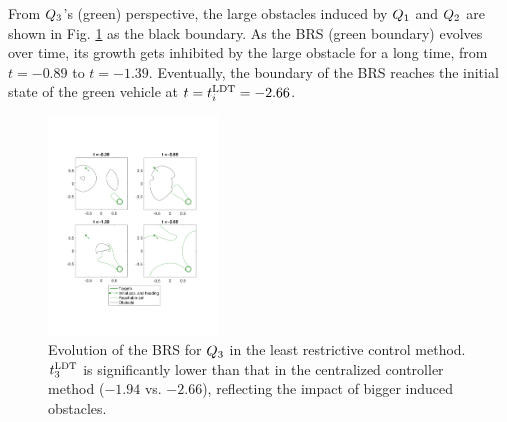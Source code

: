 From $Q_3$'s (green) perspective, the large obstacles induced by $Q_1$ and $Q_2$ are shown in Fig. \ref{fig:lrc_rs3} as the black boundary. As the BRS (green boundary) evolves over time, its growth gets inhibited by the large obstacle for a long time, from $t=-0.89$ to $t=-1.39$. Eventually, the boundary of the BRS reaches the initial state of the green vehicle at $t = t^\text{LDT}_i = -2.66$.

\begin{figure}[h]
  \vspace{-1em}
  \centering
  \includegraphics[width=0.40\textwidth]{"fig/lrc_rs3"}
  \caption{Evolution of the BRS for $Q_3$ in the least restrictive control method. $t^\text{LDT}_3$ is significantly lower than that in the centralized controller method ($-1.94$ vs. $-2.66$), reflecting the impact of bigger induced obstacles.}
  \label{fig:lrc_rs3}
  \vspace{-1em}
\end{figure}